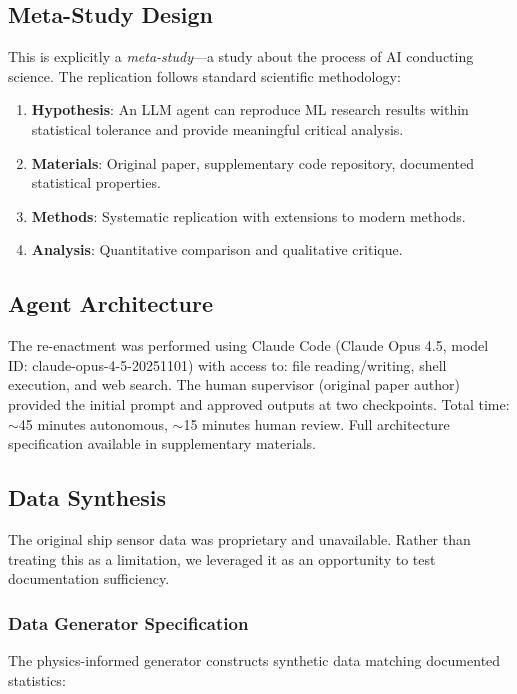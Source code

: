 \documentclass[conference]{IEEEtran}
\begin{document}
\subsection{Meta-Study Design}

This is explicitly a \textit{meta-study}---a study about the process of AI conducting science. The replication follows standard scientific methodology:

\begin{enumerate}
    \item \textbf{Hypothesis}: An LLM agent can reproduce ML research results within statistical tolerance and provide meaningful critical analysis.
    \item \textbf{Materials}: Original paper, supplementary code repository, documented statistical properties.
    \item \textbf{Methods}: Systematic replication with extensions to modern methods.
    \item \textbf{Analysis}: Quantitative comparison and qualitative critique.
\end{enumerate}

\subsection{Agent Architecture}

The re-enactment was performed using Claude Code (Claude Opus 4.5, model ID: claude-opus-4-5-20251101) with access to: file reading/writing, shell execution, and web search. The human supervisor (original paper author) provided the initial prompt and approved outputs at two checkpoints. Total time: $\sim$45 minutes autonomous, $\sim$15 minutes human review. Full architecture specification available in supplementary materials.

\subsection{Data Synthesis}

The original ship sensor data was proprietary and unavailable. Rather than treating this as a limitation, we leveraged it as an opportunity to test documentation sufficiency.

\subsubsection{Data Generator Specification}

The physics-informed generator constructs synthetic data matching documented statistics:
\end{document}

